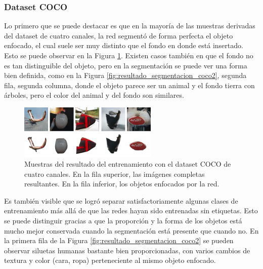 \documentclass[spanish]{report}
\begin{document}
\subsubsection{Dataset COCO} \label{resultados_coco}
\enlargethispage{0.4in}
Lo primero que se puede destacar es que en la mayoría de las muestras derivadas del dataset de cuatro canales, la red segmentó de forma perfecta el objeto enfocado, el cual suele ser muy distinto que el fondo en donde está insertado. Esto se puede observar en la Figura \ref{fig:resultado_segmentacion_coco}. Existen casos también en que el fondo no es tan distinguible del objeto, pero en la segmentación se puede ver una forma bien definida, como en la Figura \ref{fig:resultado_segmentacion_coco2}, segunda fila, segunda columna, donde el objeto parece ser un animal y el fondo tierra con árboles, pero el color del animal y del fondo son similares.

\begin{figure}[H]
\centering
 \includegraphics[width=250px]{resultado_segmentacion_coco.jpg}
   \caption{Muestras del resultado del entrenamiento con el dataset COCO de cuatro canales. En la fila superior, las imágenes completas resultantes. En la fila inferior, los objetos enfocados por la red.}
  \label{fig:resultado_segmentacion_coco}
\end{figure}

Es también visible que se logró separar satisfactoriamente algunas clases de entrenamiento más allá de que las redes hayan sido entrenadas sin etiquetas. Esto se puede distinguir gracias a que la proporción y la forma de los objetos está mucho mejor conservada cuando la segmentación está presente que cuando no. En la primera fila de la Figura \ref{fig:resultado_segmentacion_coco2} se pueden observar siluetas humanas bastante bien proporcionadas, con varios cambios de textura y color (cara, ropa) perteneciente al mismo objeto enfocado. 
\end{document}
